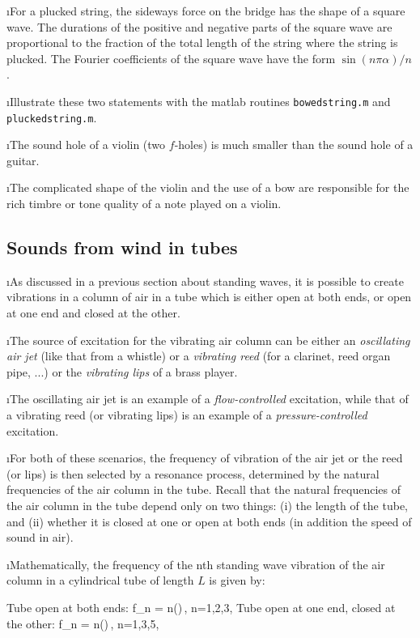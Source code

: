 \i For a plucked string, the sideways force on 
the bridge has the shape of a square wave.
The durations of the positive and negative parts
of the square wave are proportional to the 
fraction of the total length of the string where 
the string is plucked.
The Fourier coefficients of the square wave 
have the form $\sin(n\pi\alpha)/n$.

\i \demo Illustrate these two statements with the 
matlab routines 
{\tt bowedstring.m} and
{\tt pluckedstring.m}.

\i The sound hole of a violin (two $f$-holes)
is much smaller than the sound hole of a guitar.

\i The complicated shape of the violin and 
the use of a bow are responsible for the rich
timbre or tone quality of a note played on
a violin.

\ei
\subsection{Sounds from wind in tubes}
\bi

\i As discussed in a previous section about 
standing waves, it is possible to create 
vibrations in a column of air in a tube which 
is either open at both ends, or open at one end
and closed at the other.

\i The source of excitation for the vibrating
air column can be either an 
{\em oscillating air jet} 
(like that from a whistle) or a 
{\em vibrating reed} 
(for a clarinet, reed organ pipe, ...) or the
{\em vibrating lips} of a brass player.

\i The oscillating air jet is an example of 
a {\em flow-controlled} excitation, while that of
a vibrating reed (or vibrating lips) is an 
example of a {\em pressure-controlled} excitation.

\i For both of these scenarios, the frequency 
of vibration of the air jet or the reed 
(or lips) is then selected by a resonance process, 
determined by the natural frequencies of the
air column in the tube.  
Recall that the natural frequencies of the air
column in the tube depend only on two things:
(i) the length of the tube, and (ii) whether it 
is closed at one or open at both ends
(in addition the speed of sound in air).

\i Mathematically, the frequency of the nth 
standing wave vibration of the air column
in a cylindrical tube of length $L$ is given by:

Tube open at both ends:
%
\be
f_n = n\left(\right)\,,
\qquad
n=1,2,3,\cdots
\label{e:open}
\ee
%
Tube open at one end, closed at the other:
%
\be
f_n = n\left(\right)\,,
\qquad
n=1,3,5,\cdots
\label{e:closed}
\ee
%

